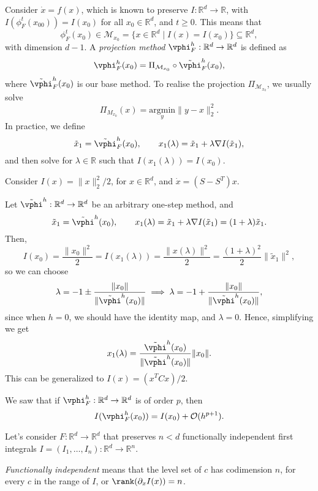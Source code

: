 \documentclass[12pt]{article}
\begin{document}
Consider $\dot x = f(x)$, which is known to preserve $I : \mathbb{R}^{d} \to \mathbb{R}$, with $I(\phi_F^{t}(x_00)) = I(x_0)$ for all $x_0 \in \mathbb{R}^{d}$, and $t \geq 0$. This means that
\[
	\phi_F^{t}(x_0) \in \mathcal{M}_{x_0} = \{x \in \mathbb{R}^{d} \mid I(x) = I(x_0) \} \subseteq \mathbb{R}^{d},
\]
with dimension $d-1$. A \emph{projection method} $\vphi_F^{h} : \mathbb{R}^{d} \to \mathbb{R}^{d}$ is defined as
\[
\vphi_F^{h}(x_0) = \Pi_{\mathcal{M}_{x_0}} \circ \tilde \vphi_F^{h}(x_0),
\]
where $\tilde \vphi_F^{h}(x_0)$ is our base method. To realise the projection $\Pi_{\mathcal{M}_{x_0}}$, we usually solve
\[
	\Pi_{M_{x_0}}(x) = \underset{y}{\mathrm{argmin}} \|y - x\|_2^2.
\]
In practice, we define
\[
\tilde x_1 = \tilde \vphi_F^{h}(x_0), \qquad x_1(\lambda) = \tilde x_1 + \lambda \nabla I(\tilde x_1),
\]
and then solve for $\lambda \in \mathbb{R}$ such that $I(x_1(\lambda)) = I(x_0)$.

\begin{exbox}
	Consider $I(x) = \|x\|_2^2/2$, for $x \in \mathbb{R}^{d}$, and $\dot x = (S - S^{T})x$.

	Let $\tilde \vphi^{h} : \mathbb{R}^{d} \to \mathbb{R}^{d}$ be an arbitrary one-step method, and
	\[
	\tilde x_1 = \tilde \vphi^{h}(x_0), \qquad x_1(\lambda) = \tilde x_1 + \lambda \nabla I(\tilde x_1) = (1 + \lambda)\tilde x_1.
	\]
	Then,
	\[
	I(x_0) = \frac{\|x_0\|^2}{2} = I(x_1(\lambda)) = \frac{\|x(\lambda)\|^2}{2} = \frac{(1 + \lambda)^2}{2} \|\tilde x_1\|^2,
	\]
	so we can choose
	\[
	\lambda = -1 \pm \frac{\|x_0\|}{\|\tilde \vphi^{h}(x_0)\|} \implies \lambda = -1 + \frac{\|x_0\|}{\|\tilde \vphi^{h}(x_0)\|},
	\]
	since when $h = 0$, we should have the identity map, and $\lambda = 0$. Hence, simplifying we get
	\[
	x_1(\lambda) = \frac{\tilde \vphi^{h}(x_0)}{\|\tilde \vphi^{h}(x_0)\|} \|x_0\|.
	\]
	This can be generalized to $I(x) = (x^{T} C x)/2$.
\end{exbox}

We saw that if $\vphi^{h}_F: \mathbb{R}^{d} \to \mathbb{R}^{d}$ is of order $p$, then
\[
I(\vphi_F^{h}(x_0)) = I(x_0) + \mathcal{O}(h^{p+1}).
\]

Let's consider $F : \mathbb{R}^{d}\to \mathbb{R}^{d}$ that preserves $n < d$ functionally independent first integrals $I = (I_1, \ldots, I_n) : \mathbb{R}^{d} \to \mathbb{R}^{n}$.

\emph{Functionally independent} means that the level set of $c$ has codimension $n$, for every $c$ in the range of $I$, or $\rank (\partial_x I(x)) = n$.
\end{document}

